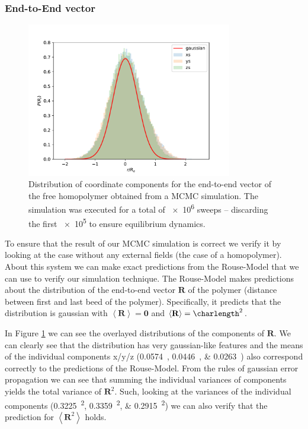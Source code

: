 \documentclass[../main.tex]{subfiles}
\begin{document}
\subsubsection{End-to-End vector}

\begin{figure}[htpb]
    \centering
    \includegraphics[width=0.8\textwidth]{../figures/ex1_end_to_end_homopolymer.pdf}
    \caption{
        Distribution of coordinate components for the end-to-end vector of the free homopolymer obtained from a MCMC simulation.
        The simulation was executed for a total of \num{e6} sweeps -- discarding the first \num{e5} to ensure equilibrium dynamics.
    }
    \label{fig:ex1_end_to_end_homopolymer}
\end{figure}

To ensure that the result of our MCMC simulation is correct we verify it by looking at the case without any external fields (the case of a homopolymer).
About this system we can make exact predictions from the Rouse-Model that we can use to verify our simulation technique.
The Rouse-Model makes predictions about the distribution of the end-to-end vector $\mathbf{R}$ of the polymer (distance between first and last beed of the polymer).
Specifically, it predicts that the distribution is gaussian with $\left< \mathbf{R} \right> = \mathbf{0}$ and $\left< \mathbf{R} \right> = \unit{\charlength\squared}$.
\par

In Figure \ref{fig:ex1_end_to_end_homopolymer} we can see the overlayed distributions of the components of $\mathbf{R}$.
We can clearly see that the distribution has very gaussian-like features and the means of the individual components x/y/z (\qtylist{.0574; .0446; .0263}{\charlength}) also correspond correctly to the predictions of the Rouse-Model.
From the rules of gaussian error propagation we can see that summing the individual variances of components yields the total variance of $\mathbf{R} ^2$.
Such, looking at the variances of the individual components (\qtylist{.3225;.3359;.2915}{\charlength\squared}) we can also verify that the prediction for $\left<\mathbf{R} ^2 \right>$ holds.
\end{document}

